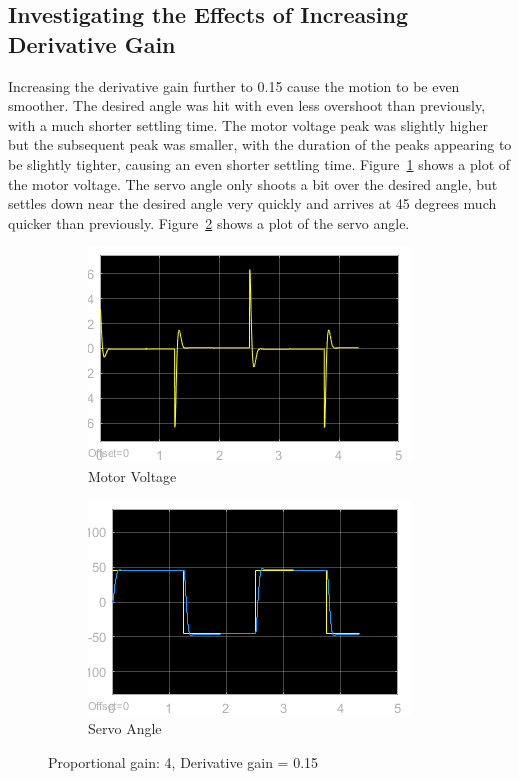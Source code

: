 \documentclass[12pt]{article}
\begin{document}
\subsection*{Investigating the Effects of Increasing Derivative Gain} %
Increasing the derivative gain further to 0.15 cause the motion to be even smoother. The desired angle was hit with even less overshoot than previously, with a much shorter settling time. The motor voltage peak was slightly higher but the subsequent peak was smaller, with the duration of the peaks appearing to be slightly tighter, causing an even shorter settling time. Figure~\ref{fig:xii_volt} shows a plot of the motor voltage. The servo angle only shoots a bit over the desired angle, but settles down near the desired angle very quickly and arrives at 45 degrees much quicker than previously. Figure~\ref{fig:xii_angle} shows a plot of the servo angle.
\begin{figure}[h!]
    \centering
    \begin{subfigure}[b]{0.49\textwidth}
        \includegraphics[width=\textwidth]{xii_voltage}
        \caption{\label{fig:xii_volt}Motor Voltage}     
    \end{subfigure}
    \begin{subfigure}[b]{0.49\textwidth}
        \includegraphics[width=\textwidth]{xii_angle}
        \caption{\label{fig:xii_angle}Servo Angle} 
    \end{subfigure}
    \caption{\label{fig:xii} Proportional gain: 4, Derivative gain = 0.15}
    \vspace{128in} %
\end{figure}
\end{document}
